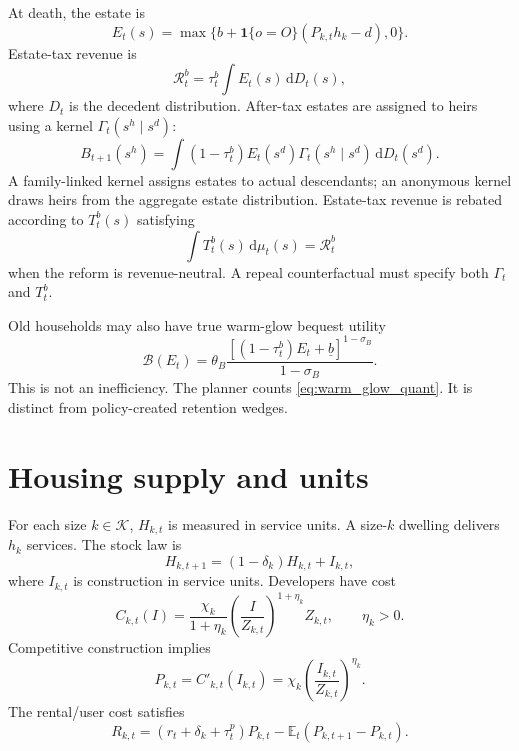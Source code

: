 \documentclass[11pt]{article}
\newcommand{\dd}{\mathrm d}
\newcommand{\E}{\mathbb E}
\newcommand{\1}{\mathbf 1}
\newcommand{\KK}{\mathcal K}
\begin{document}
At death, the estate is
\begin{equation}
E_t(s)=\max\{b+\1\{o=O\}(P_{k,t}h_k-d),0\}.
\end{equation}
Estate-tax revenue is
\begin{equation}
\mathcal R_t^b=\tau_t^b\int E_t(s)\,\dd D_t(s),
\label{eq:estate_tax_revenue_quant}
\end{equation}
where $D_t$ is the decedent distribution. After-tax estates are assigned to heirs using a kernel $\Gamma_t(s^h\mid s^d)$:
\begin{equation}
B_{t+1}(s^h)=\int (1-\tau_t^b)E_t(s^d)\Gamma_t(s^h\mid s^d)\,\dd D_t(s^d).
\label{eq:inheritance_kernel_quant}
\end{equation}
A family-linked kernel assigns estates to actual descendants; an anonymous kernel draws heirs from the aggregate estate distribution. Estate-tax revenue is rebated according to $T_t^b(s)$ satisfying
\begin{equation}
\int T_t^b(s)\,\dd\mu_t(s)=\mathcal R_t^b
\label{eq:estate_rebate_quant}
\end{equation}
when the reform is revenue-neutral. A repeal counterfactual must specify both $\Gamma_t$ and $T_t^b$.

Old households may also have true warm-glow bequest utility
\begin{equation}
\mathcal B(E_t)=\theta_B\frac{\left[(1-\tau_t^b)E_t+\underline b\right]^{1-\sigma_B}}{1-\sigma_B}.
\label{eq:warm_glow_quant}
\end{equation}
This is not an inefficiency. The planner counts \eqref{eq:warm_glow_quant}. It is distinct from policy-created retention wedges.

\section{Housing supply and units}

For each size $k\in\KK$, $H_{k,t}$ is measured in service units. A size-$k$ dwelling delivers $h_k$ services. The stock law is
\begin{equation}
H_{k,t+1}=(1-\delta_k)H_{k,t}+I_{k,t},
\label{eq:stock_law_quant}
\end{equation}
where $I_{k,t}$ is construction in service units. Developers have cost
\begin{equation}
C_{k,t}(I)=\frac{\chi_k}{1+\eta_k}\left(\frac{I}{Z_{k,t}}\right)^{1+\eta_k}Z_{k,t},
\qquad \eta_k>0.
\label{eq:construction_quant}
\end{equation}
Competitive construction implies
\begin{equation}
P_{k,t}=C'_{k,t}(I_{k,t})=\chi_k\left(\frac{I_{k,t}}{Z_{k,t}}\right)^{\eta_k}.
\label{eq:developer_foc_quant}
\end{equation}
The rental/user cost satisfies
\begin{equation}
R_{k,t}=(r_t+\delta_k+\tau_t^p)P_{k,t}-\E_t(P_{k,t+1}-P_{k,t}).
\label{eq:user_cost_quant}
\end{equation}
\end{document}
